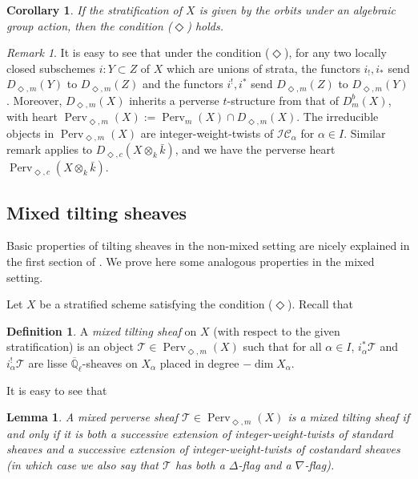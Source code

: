 \documentclass{amsart}
\theoremstyle{plain}
\newtheorem{lemma}[subsubsection]{Lemma}
\newtheorem{cor}[subsubsection]{Corollary}
\theoremstyle{definition}
\newtheorem{defn}[subsubsection]{Definition}
\theoremstyle{remark}
\newtheorem*{remark}{Remark}
\numberwithin{equation}{subsection}
\begin{document}
\begin{cor}\label{c:orbits}
If the stratification of $X$ is given by the orbits under an algebraic group action, then the condition ($\Diamond$) holds. 
\end{cor}

\begin{remark}
It is easy to see that under the condition ($\Diamond$), for any two locally closed subschemes $i:Y\subset Z$ of $X$ which are unions of strata, the functors $i_!,i_*$ send ${D_{\Diamond,m}({Y})}$ to ${D_{\Diamond,m}({Z})}$ and the functors $i^!,i^*$ send ${D_{\Diamond,m}({Z})}$ to ${D_{\Diamond,m}({Y})}$. Moreover, ${D_{\Diamond,m}({X})}$ inherits a perverse $t$-structure from that of ${D^b_m({X})}$, with heart ${\operatorname{Perv}_{\Diamond,m}({X})}:={\operatorname{Perv}_m({X})}\cap {D_{\Diamond,m}({X})}$. The irreducible objects in ${\operatorname{Perv}_{\Diamond,m}({X})}$ are integer-weight-twists of ${\mathcal{IC}}_{\alpha}$ for $\alpha\in I$. Similar remark applies to ${D_{\Diamond,c}({{{X}}\otimes_k\bar{k}})}$, and we have the perverse heart ${\operatorname{Perv}_{\Diamond,c}({{{X}}\otimes_k\bar{k}})}$.
\end{remark}

\subsection{Mixed tilting sheaves}\label{ss:basic} Basic properties of tilting sheaves in the non-mixed setting are nicely explained in the first section of \cite{BBM}. We prove here some analogous properties in the mixed setting.

Let $X$ be a stratified scheme satisfying the condition ($\Diamond$). Recall that
\begin{defn}\label{d:mt}
A {\em mixed tilting sheaf} on $X$ (with respect to the given stratification) is an object ${\mathcal{T}}\in {\operatorname{Perv}_{\Diamond,m}({X})}$ such that for all $\alpha\in I$, $i_\alpha^*{\mathcal{T}}$ and $i_\alpha^!{\mathcal{T}}$ are lisse ${\overline{\mathbb{Q}}_{\ell}}$-sheaves on $X_\alpha$ placed in degree $-\dim X_\alpha$.
\end{defn}

It is easy to see that
\begin{lemma}\label{l:fil}
A mixed perverse sheaf ${\mathcal{T}}\in {\operatorname{Perv}_{\Diamond,m}({X})}$ is a mixed tilting sheaf if and only if it is both a successive extension of integer-weight-twists of standard sheaves and a successive extension of integer-weight-twists of costandard sheaves (in which case we also say that ${\mathcal{T}}$ has both a $\Delta$-flag and a $\nabla$-flag).
\end{lemma}
\end{document}
